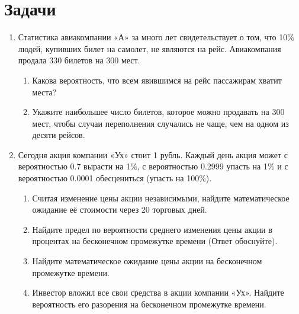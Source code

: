 \documentclass[11pt]{article} %
\begin{document}
\section{Задачи}

\begin{enumerate}[resume]

\item Статистика авиакомпании «А» за много лет свидетельствует о том, что 10\% людей, купивших билет на самолет, не являются на рейс. Авиакомпания продала 330 билетов на 300 мест.
\begin{enumerate}
\item Какова вероятность, что всем явившимся на рейс пассажирам хватит места?
\item Укажите наибольшее число билетов, которое можно продавать на 300 мест, чтобы случаи переполнения случались не чаще, чем на одном из десяти рейсов.
\end{enumerate}

\item Сегодня акция компании «Ух» стоит 1 рубль. Каждый день акция может с вероятностью 0.7 вырасти на 1\%, с вероятностью 0.2999 упасть на 1\% и с вероятностью 0.0001 обесцениться (упасть на 100\%).
\begin{enumerate}
\item Считая изменение цены акции независимыми, найдите математическое ожидание её стоимости через 20 торговых дней.
\item Найдите предел по вероятности среднего изменения цены акции в процентах на бесконечном промежутке времени (Ответ обоснуйте).
\item Найдите математическое ожидание цены акции на бесконечном промежутке времени.
\item Инвестор вложил все свои средства в акции компании «Ух». Найдите вероятность его разорения на бесконечном промежутке времени.
\end{enumerate}


\end{enumerate}
\end{document}

